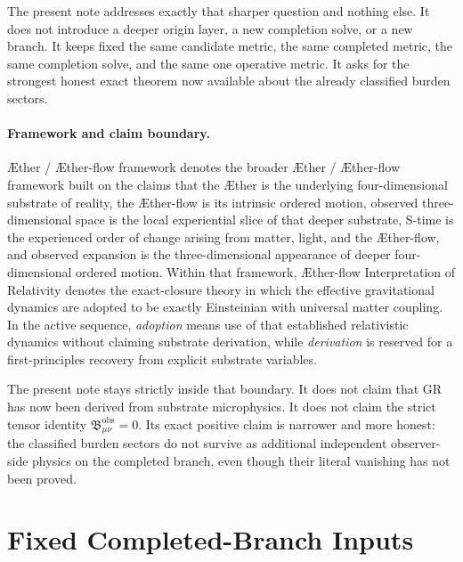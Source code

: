 \documentclass[11pt]{article}
\newcommand{\Aether}{\AE{}ther}
\newcommand{\Aflow}{\AE{}ther-flow}
\newcommand{\TheoryName}{\Aflow{} Interpretation of Relativity}
\newcommand{\TheoryProgram}{\Aether{} / \Aflow{} framework}
\newcommand{\ObsBurden}{\mathfrak B_{\mu\nu}^{\mathrm{obs}}}
\begin{document}
The present note addresses exactly that sharper question and nothing else. It does not introduce a deeper origin layer, a new completion solve, or a new branch. It keeps fixed the same candidate metric, the same completed metric, the same completion solve, and the same one operative metric. It asks for the strongest honest exact theorem now available about the already classified burden sectors.

\paragraph{Framework and claim boundary.}
\TheoryProgram{} denotes the broader \Aether{} / \Aflow{} framework built on the claims that the \Aether{} is the underlying four-dimensional substrate of reality, the \Aflow{} is its intrinsic ordered motion, observed three-dimensional space is the local experiential slice of that deeper substrate, S-time is the experienced order of change arising from matter, light, and the \Aflow{}, and observed expansion is the three-dimensional appearance of deeper four-dimensional ordered motion. Within that framework, \TheoryName{} denotes the exact-closure theory in which the effective gravitational dynamics are adopted to be exactly Einsteinian with universal matter coupling. In the active sequence, \emph{adoption} means use of that established relativistic dynamics without claiming substrate derivation, while \emph{derivation} is reserved for a first-principles recovery from explicit substrate variables.

The present note stays strictly inside that boundary. It does not claim that GR has now been derived from substrate microphysics. It does not claim the strict tensor identity \(\ObsBurden=0\). Its exact positive claim is narrower and more honest: the classified burden sectors do not survive as additional independent observer-side physics on the completed branch, even though their literal vanishing has not been proved.

\section{Fixed Completed-Branch Inputs}
\end{document}

